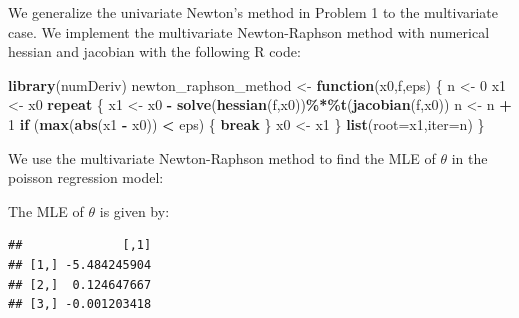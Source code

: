 \documentclass[
  10pt,
  twocolumn]{article}
\newenvironment{Shaded}{\begin{snugshade}}{\end{snugshade}}
\newcommand{\AttributeTok}[1]{\textcolor[rgb]{0.13,0.29,0.53}{#1}}
\newcommand{\CommentTok}[1]{\textcolor[rgb]{0.56,0.35,0.01}{\textit{#1}}}
\newcommand{\ControlFlowTok}[1]{\textcolor[rgb]{0.13,0.29,0.53}{\textbf{#1}}}
\newcommand{\DecValTok}[1]{\textcolor[rgb]{0.00,0.00,0.81}{#1}}
\newcommand{\FloatTok}[1]{\textcolor[rgb]{0.00,0.00,0.81}{#1}}
\newcommand{\FunctionTok}[1]{\textcolor[rgb]{0.13,0.29,0.53}{\textbf{#1}}}
\newcommand{\NormalTok}[1]{#1}
\newcommand{\OtherTok}[1]{\textcolor[rgb]{0.56,0.35,0.01}{#1}}
\newcommand{\SpecialCharTok}[1]{\textcolor[rgb]{0.81,0.36,0.00}{\textbf{#1}}}
\begin{document}
We generalize the univariate Newton's method in Problem 1 to the
multivariate case. We implement the multivariate Newton-Raphson method
with numerical hessian and jacobian with the following R code:

\begin{Shaded}
\begin{Highlighting}[]
\FunctionTok{library}\NormalTok{(numDeriv)}
\NormalTok{newton\_raphson\_method }\OtherTok{\textless{}{-}} \ControlFlowTok{function}\NormalTok{(x0,f,eps)}
\NormalTok{\{}
\NormalTok{  n }\OtherTok{\textless{}{-}} \DecValTok{0}
\NormalTok{  x1 }\OtherTok{\textless{}{-}}\NormalTok{ x0}
  \ControlFlowTok{repeat}
\NormalTok{  \{}
\NormalTok{      x1 }\OtherTok{\textless{}{-}}\NormalTok{ x0 }\SpecialCharTok{{-}} \FunctionTok{solve}\NormalTok{(}\FunctionTok{hessian}\NormalTok{(f,x0))}\SpecialCharTok{\%*\%}\FunctionTok{t}\NormalTok{(}\FunctionTok{jacobian}\NormalTok{(f,x0))}
\NormalTok{      n }\OtherTok{\textless{}{-}}\NormalTok{ n }\SpecialCharTok{+} \DecValTok{1}
      \ControlFlowTok{if}\NormalTok{ (}\FunctionTok{max}\NormalTok{(}\FunctionTok{abs}\NormalTok{(x1 }\SpecialCharTok{{-}}\NormalTok{ x0)) }\SpecialCharTok{\textless{}}\NormalTok{ eps) \{ }\ControlFlowTok{break}\NormalTok{ \}}
\NormalTok{      x0 }\OtherTok{\textless{}{-}}\NormalTok{ x1}
\NormalTok{  \}}
  \FunctionTok{list}\NormalTok{(}\AttributeTok{root=}\NormalTok{x1,}\AttributeTok{iter=}\NormalTok{n)}
\NormalTok{\}}
\end{Highlighting}
\end{Shaded}

We use the multivariate Newton-Raphson method to find the MLE of
\(\theta\) in the poisson regression model:

\begin{Shaded}
\end{Shaded}

The MLE of \(\theta\) is given by:

\begin{verbatim}
##              [,1]
## [1,] -5.484245904
## [2,]  0.124647667
## [3,] -0.001203418
\end{verbatim}
\end{document}
